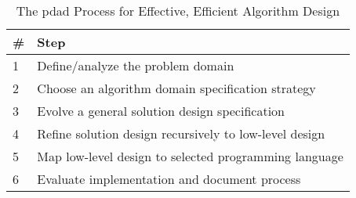 \documentclass[../main.tex]{subfiles}
\begin{document}
\begin{table}
\caption{The \acl{pdad} Process for Effective, Efficient Algorithm Design}
\centering
\label{tab:pdad}
\begin{tabular}{|l|l|}
\hline
\textbf{\#} & \textbf{Step}                                              \\
\hline
1               & Define/analyze the problem domain                      \\
2               & Choose an algorithm domain specification strategy      \\
3               & Evolve a general solution design specification         \\
4               & Refine solution design recursively to low-level design \\
5               & Map low-level design to selected programming language  \\
6               & Evaluate implementation and document process           \\
\hline
\end{tabular}
\end{table}
\end{document}
